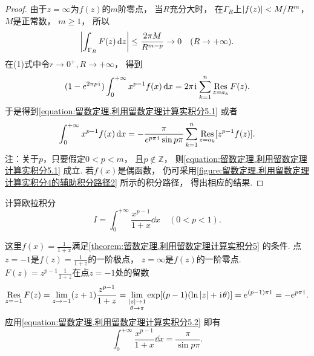 \begin{theorem}
\begin{proof}
由于\(z=\infty\)为\(f(z)\)的\(m\)阶零点，
当\(R\)充分大时，
在\(\Gamma_R\)上\(\abs{f(z)}<M/R^m\)，
\(M\)是正常数，
\(m\geq1\)，
所以\begin{equation*}
	\abs{\int_{\Gamma_R} F(z) \dd{z}}
	\leq \frac{2\pi M}{R^{m-p}} \to0\quad(R\to+\infty).
\end{equation*}
在(1)式中令\(r\to0^+,R\to+\infty\)，
得到\begin{equation*}
	(1-e^{2\pi p\kern1pt\mathrm{i}\kern1pt}) \int_0^{+\infty} x^{p-1} f(x) \dd{x}
	= 2\pi\kern1pt\mathrm{i}\kern1pt \sum_{k=1}^n \operatorname*{Res}_{z=a_k} F(z).
\end{equation*}
于是得到\cref{equation:留数定理.利用留数定理计算实积分5.1}
或者\begin{equation}\label{equation:留数定理.利用留数定理计算实积分5.2}
	\int_0^{+\infty} x^{p-1} f(x) \dd{x}
	= -\frac{\pi}{e^{p\pi\kern1pt\mathrm{i}\kern1pt} \sin p\pi} \sum_{k=1}^n \operatorname*{Res}_{z=a_k}[z^{p-1} f(z)].
\end{equation}
注：关于\(p\)，只要假定\(0<p<m\)，
且\(p\notin\mathbb{Z}\)，
则\cref{equation:留数定理.利用留数定理计算实积分5.1} 成立.
若\(f(x)\)是偶函数，
仍可采用\cref{figure:留数定理.利用留数定理计算实积分4的辅助积分路径2} 所示的积分路径，
得出相应的结果.
\end{proof}
\end{theorem}

\begin{example}
计算欧拉积分\begin{equation*}
	I = \int_0^{+\infty} \frac{x^{p-1}}{1+x} \dd{x} \quad(0<p<1).
\end{equation*}
\begin{solution}
这里\(f(x) = \frac{1}{1+x}\)满足\cref{theorem:留数定理.利用留数定理计算实积分5} 的条件.
点\(z=-1\)是\(f(z) = \frac{1}{1+z}\)的一阶极点，
\(z=\infty\)是\(f(z)\)的一阶零点.
\(F(z) = z^{p-1} \frac{1}{1+z}\)在点\(z=-1\)处的留数\begin{equation*}
	\operatorname*{Res}_{z=-1} F(z)
	= \lim_{z\to-1} (z+1) \frac{z^{p-1}}{1+z}
	= \lim_{\substack{\abs{z}\to1 \\ \theta\to\pi}} \exp[(p-1)(\ln\abs{z}+\kern1pt\mathrm{i}\kern1pt\theta)]
	= e^{(p-1)\pi\kern1pt\mathrm{i}\kern1pt}
	= -e^{p\pi\kern1pt\mathrm{i}\kern1pt}.
\end{equation*}
应用\cref{equation:留数定理.利用留数定理计算实积分5.2}
即有\begin{equation}
	\int_0^{+\infty} \frac{x^{p-1}}{1+x} \dd{x} = \frac{\pi}{\sin p\pi}.
\end{equation}
\end{solution}
\end{example}

